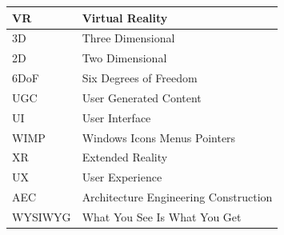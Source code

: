 \documentclass[inscr,ack,preface]{dithesis}
\begin{document}
\backmatter

\abbreviations
\begin{center}
  \renewcommand{\arraystretch}{1.5}
  \begin{longtable}{| l | @{\qquad} l |}
    \hline
    VR      & Virtual Reality                       \\
    \hline
    3D      & Three Dimensional                     \\
    \hline
    2D      & Two Dimensional                       \\
    \hline
    6DoF    & Six Degrees of Freedom                \\
    \hline
    UGC     & User Generated Content                \\
    \hline
    UI      & User Interface                        \\
    \hline
    WIMP    & Windows Icons Menus Pointers          \\
    \hline
    XR      & Extended Reality                      \\
    \hline
    UX      & User Experience                       \\
    \hline
    AEC     & Architecture Engineering Construction \\
    \hline
    WYSIWYG & What You See Is What You Get          \\
    \hline
  \end{longtable}
\end{center}
\end{document}

